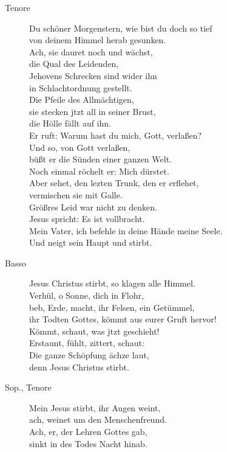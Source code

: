 \documentclass[parskip=full]{scrreprt}
\begin{document}
\begin{description}
	\item[Tenore]
	Du schöner Morgenstern, wie bist du doch so tief\\
	von deinem Himmel herab gesunken.\\
	Ach, sie dauret noch und wächst,\\
	die Qual des Leidenden,\\
	Jehovens Schrecken sind wider ihn\\
	in Schlachtordnung gestellt.\\
	Die Pfeile des Allmächtigen,\\
	sie stecken jtzt all in seiner Brust,\\
	die Hölle fällt auf ihn.\\
	Er ruft: Warum hast du mich, Gott, verlaßen?\\
	Und so, von Gott verlaßen,\\
	büßt er die Sünden einer ganzen Welt.\\
	Noch einmal röchelt er: Mich dürstet.\\
	Aber sehet, den lezten Trunk, den er erflehet,\\
	vermischen sie mit Galle.\\
	Größres Leid war nicht zu denken.\\
	Jesus spricht: Es ist vollbracht.\\
	Mein Vater, ich befehle in deine Hände meine Seele.\\
	Und neigt sein Haupt und stirbt.
	
	\item[Basso]
	Jesus Christus stirbt, so klagen alle Himmel.\\
	Verhül, o Sonne, dich in Flohr,\\
	beb, Erde, macht, ihr Felsen, ein Getümmel,\\
	ihr Todten Gottes, kömmt aus eurer Gruft hervor!\\
	Kömmt, schaut, was jtzt geschieht!\\
	Erstaunt, fühlt, zittert, schaut:\\
	Die ganze Schöpfung ächze laut,\\
	denn Jesus Christus stirbt.
	
	\item[Sop., Tenore]
	Mein Jesus stirbt, ihr Augen weint,\\
	ach, weinet um den Menschenfreund.\\
	Ach, er, der Lehren Gottes gab,\\
	sinkt in des Todes Nacht hinab.
	

\end{description}
\end{document}
